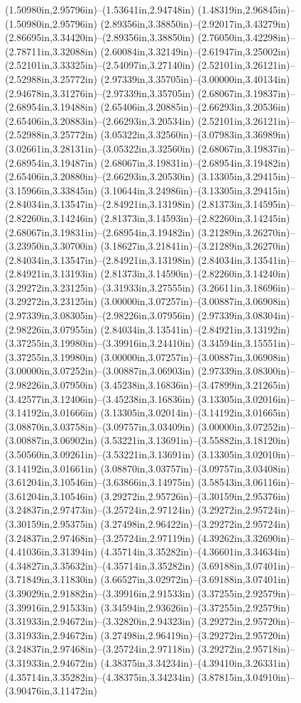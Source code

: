 (1.50980in,2.95796in)--(1.53641in,2.94748in) (1.48319in,2.96845in)--(1.50980in,2.95796in) (2.89356in,3.38850in)--(2.92017in,3.43279in) (2.86695in,3.34420in)--(2.89356in,3.38850in) (2.76050in,3.42298in)--(2.78711in,3.32088in) (2.60084in,3.32149in)--(2.61947in,3.25002in) (2.52101in,3.33325in)--(2.54097in,3.27140in) (2.52101in,3.26121in)--(2.52988in,3.25772in) (2.97339in,3.35705in)--(3.00000in,3.40134in) (2.94678in,3.31276in)--(2.97339in,3.35705in) (2.68067in,3.19837in)--(2.68954in,3.19488in) (2.65406in,3.20885in)--(2.66293in,3.20536in) (2.65406in,3.20883in)--(2.66293in,3.20534in) (2.52101in,3.26121in)--(2.52988in,3.25772in) (3.05322in,3.32560in)--(3.07983in,3.36989in) (3.02661in,3.28131in)--(3.05322in,3.32560in) (2.68067in,3.19837in)--(2.68954in,3.19487in) (2.68067in,3.19831in)--(2.68954in,3.19482in) (2.65406in,3.20880in)--(2.66293in,3.20530in) (3.13305in,3.29415in)--(3.15966in,3.33845in) (3.10644in,3.24986in)--(3.13305in,3.29415in) (2.84034in,3.13547in)--(2.84921in,3.13198in) (2.81373in,3.14595in)--(2.82260in,3.14246in) (2.81373in,3.14593in)--(2.82260in,3.14245in) (2.68067in,3.19831in)--(2.68954in,3.19482in) (3.21289in,3.26270in)--(3.23950in,3.30700in) (3.18627in,3.21841in)--(3.21289in,3.26270in) (2.84034in,3.13547in)--(2.84921in,3.13198in) (2.84034in,3.13541in)--(2.84921in,3.13193in) (2.81373in,3.14590in)--(2.82260in,3.14240in) (3.29272in,3.23125in)--(3.31933in,3.27555in) (3.26611in,3.18696in)--(3.29272in,3.23125in) (3.00000in,3.07257in)--(3.00887in,3.06908in) (2.97339in,3.08305in)--(2.98226in,3.07956in) (2.97339in,3.08304in)--(2.98226in,3.07955in) (2.84034in,3.13541in)--(2.84921in,3.13192in) (3.37255in,3.19980in)--(3.39916in,3.24410in) (3.34594in,3.15551in)--(3.37255in,3.19980in) (3.00000in,3.07257in)--(3.00887in,3.06908in) (3.00000in,3.07252in)--(3.00887in,3.06903in) (2.97339in,3.08300in)--(2.98226in,3.07950in) (3.45238in,3.16836in)--(3.47899in,3.21265in) (3.42577in,3.12406in)--(3.45238in,3.16836in) (3.13305in,3.02016in)--(3.14192in,3.01666in) (3.13305in,3.02014in)--(3.14192in,3.01665in) (3.08870in,3.03758in)--(3.09757in,3.03409in) (3.00000in,3.07252in)--(3.00887in,3.06902in) (3.53221in,3.13691in)--(3.55882in,3.18120in) (3.50560in,3.09261in)--(3.53221in,3.13691in) (3.13305in,3.02010in)--(3.14192in,3.01661in) (3.08870in,3.03757in)--(3.09757in,3.03408in) (3.61204in,3.10546in)--(3.63866in,3.14975in) (3.58543in,3.06116in)--(3.61204in,3.10546in) (3.29272in,2.95726in)--(3.30159in,2.95376in) (3.24837in,2.97473in)--(3.25724in,2.97124in) (3.29272in,2.95724in)--(3.30159in,2.95375in) (3.27498in,2.96422in)--(3.29272in,2.95724in) (3.24837in,2.97468in)--(3.25724in,2.97119in) (4.39262in,3.32690in)--(4.41036in,3.31394in) (4.35714in,3.35282in)--(4.36601in,3.34634in) (4.34827in,3.35632in)--(4.35714in,3.35282in) (3.69188in,3.07401in)--(3.71849in,3.11830in) (3.66527in,3.02972in)--(3.69188in,3.07401in) (3.39029in,2.91882in)--(3.39916in,2.91533in) (3.37255in,2.92579in)--(3.39916in,2.91533in) (3.34594in,2.93626in)--(3.37255in,2.92579in) (3.31933in,2.94672in)--(3.32820in,2.94323in) (3.29272in,2.95720in)--(3.31933in,2.94672in) (3.27498in,2.96419in)--(3.29272in,2.95720in) (3.24837in,2.97468in)--(3.25724in,2.97118in) (3.29272in,2.95718in)--(3.31933in,2.94672in) (4.38375in,3.34234in)--(4.39410in,3.26331in) (4.35714in,3.35282in)--(4.38375in,3.34234in) (3.87815in,3.04910in)--(3.90476in,3.11472in) 